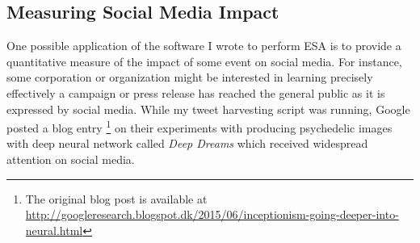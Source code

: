 \subsection{Measuring Social Media Impact}
\label{sec:social_media_impact}
One possible application of the software I wrote to perform ESA is to provide a quantitative measure of the impact of some event on social media. For instance, some corporation or organization might be interested in learning precisely effectively a campaign or press release has reached the general public as it is expressed by social media. While my tweet harvesting script was running, Google posted a blog entry%
\footnote{The original blog post is available at \url{http://googleresearch.blogspot.dk/2015/06/inceptionism-going-deeper-into-neural.html}}
on their experiments with producing psychedelic images with deep neural network called \textit{Deep Dreams} which received widespread attention on social media.

